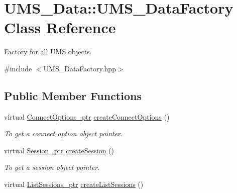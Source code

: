 \hypertarget{classUMS__Data_1_1UMS__DataFactory}{
\section{UMS\_\-Data::UMS\_\-DataFactory Class Reference}
\label{classUMS__Data_1_1UMS__DataFactory}
}


Factory for all UMS objects.  




{\ttfamily \#include $<$UMS\_\-DataFactory.hpp$>$}

\subsection*{Public Member Functions}
\begin{DoxyCompactItemize}
\item 
\hypertarget{classUMS__Data_1_1UMS__DataFactory_a723dd1837eedbc615cf6729a8e1c96ca}{
virtual \hyperlink{classUMS__Data_1_1ConnectOptions}{ConnectOptions\_\-ptr} \hyperlink{classUMS__Data_1_1UMS__DataFactory_a723dd1837eedbc615cf6729a8e1c96ca}{createConnectOptions} ()}
\label{classUMS__Data_1_1UMS__DataFactory_a723dd1837eedbc615cf6729a8e1c96ca}

\begin{DoxyCompactList}\small\item\em To get a connect option object pointer. \item\end{DoxyCompactList}\item 
\hypertarget{classUMS__Data_1_1UMS__DataFactory_acba504404431280c86249744340f6447}{
virtual \hyperlink{classUMS__Data_1_1Session}{Session\_\-ptr} \hyperlink{classUMS__Data_1_1UMS__DataFactory_acba504404431280c86249744340f6447}{createSession} ()}
\label{classUMS__Data_1_1UMS__DataFactory_acba504404431280c86249744340f6447}

\begin{DoxyCompactList}\small\item\em To get a session object pointer. \item\end{DoxyCompactList}\item 
\hypertarget{classUMS__Data_1_1UMS__DataFactory_ab7b0bf319eb1616ed46652e277473121}{
virtual \hyperlink{classUMS__Data_1_1ListSessions}{ListSessions\_\-ptr} \hyperlink{classUMS__Data_1_1UMS__DataFactory_ab7b0bf319eb1616ed46652e277473121}{createListSessions} ()}
\label{classUMS__Data_1_1UMS__DataFactory_ab7b0bf319eb1616ed46652e277473121}


\end{DoxyCompactItemize}
